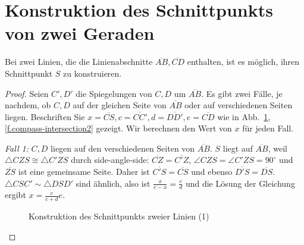 
\section{Konstruktion des Schnittpunkts von zwei Geraden}\label{s.two-lines}

\begin{theorem}
Bei zwei Linien, die die Linienabschnitte $\overline{AB}, \overline{CD}$ enthalten, ist es möglich, ihren Schnittpunkt $S$ zu konstruieren.
\end{theorem}

\begin{proof}
Seien $C',D'$ die Spiegelungen von $C,D$ um $\overline{AB}$.
Es gibt zwei Fälle, je nachdem, ob $C,D$ auf der gleichen Seite von $\overline{AB}$ oder auf verschiedenen Seiten liegen. Beschriften Sie $x=\overline{CS}, c=\overline{CC'}, d=\overline{DD'}, e=\overline{CD}$ wie in Abb.~\ref{f.compass-intersection1}, \ref{f.compass-intersection2} gezeigt. Wir berechnen den Wert von $x$ für jeden Fall.

\textit{Fall 1:}
$C,D$ liegen auf den verschiedenen Seiten von $\overline{AB}$.
$S$ liegt auf $\overline{AB}$, weil $\triangle CZS\cong \triangle C'ZS$ durch side-angle-side: $\overline{CZ}=\overline{C'Z}$, $\angle CZS=\angle C'ZS=90^\circ$ und $\overline{ZS}$ ist eine gemeinsame Seite. Daher ist $\overline{C'S}=\overline{CS}$ und ebenso $\overline{D'S}=\overline{DS}$. $\triangle CSC'\sim\triangle DSD'$ sind ähnlich, also ist $\displaystyle\frac{x}{e-x} = \displaystyle\frac{c}{d}$ und die Lösung der Gleichung ergibt $x=\displaystyle\frac{c}{c+d}e$.

\begin{figure}[ht]
\begin{center}
\end{center}
\caption{Konstruktion des Schnittpunkts zweier Linien (1)}\label{f.compass-intersection1}
\end{figure}


\end{proof}

